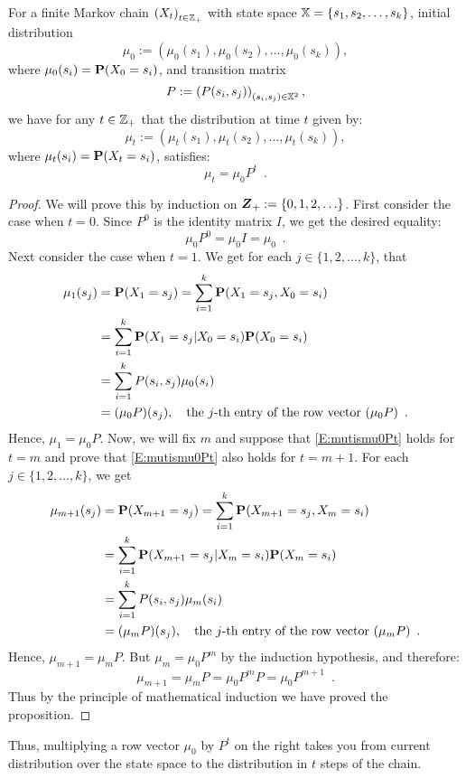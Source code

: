 {\begin{prop}\label{P:FiniteMCProbsAtTimet}
For a finite Markov chain $\left(X_t\right)_{t \in \mathbb{Z}_+}$ with state space $\mathbb{X}=\{s_1,s_2,\ldots,s_k\}$, initial distribution $$\mu_0 := \left( \mu_0(s_1), \mu_0(s_2), \ldots, \mu_0(s_k) \right),$$ where $\mu_0(s_i) = \mathbf{P}(X_0=s_i)$, and transition matrix $$P := \left(P(s_i,s_j)\right)_{(s_i,s_j)\in \mathbb{X}^2},$$ we have for any $t \in \mathbb{Z}_+$ that the distribution at time $t$ given by:
$$\mu_t := \left( \mu_t(s_1), \mu_t(s_2), \ldots, \mu_t(s_k) \right),$$
where $\mu_t(s_i) = \mathbf{P}(X_t=s_i)$, satisfies:
\begin{equation}\label{E:mutismu0Pt}
\mu_t = \mu_0 P^t \enspace .
\end{equation}
\begin{proof}
We will prove this by induction on $\Z_+:=\{0,1,2,\ldots\}$.  First consider the case when $t=0$.  Since $P^0$ is the identity matrix $I$, we get the desired equality:
\[
\mu_0 P^0 = \mu_0 I = \mu_0 \enspace .
\]
Next consider the case when $t=1$.  We get for each $j \in \{1,2,\ldots,k\}$, that
\begin{align*}
\mu_1(s_j) &= \mathbf{P}(X_1 = s_j) = \sum_{i=1}^k \mathbf{P}(X_1=s_j,X_0=s_i)\\
&= \sum_{i=1}^k \mathbf{P}(X_1=s_j | X_0=s_i) \mathbf{P}(X_0=s_i) \\
&= \sum_{i=1}^k P(s_i,s_j) \mu_0(s_i)\\
&= (\mu_0 P)(s_j), \quad \text{the $j$-th entry of the row vector $(\mu_0 P)$} \enspace .
\end{align*}
Hence, $\mu_1=\mu_0 P$.  Now, we will fix $m$ and suppose that \eqref{E:mutismu0Pt} holds for $t=m$ and prove that \eqref{E:mutismu0Pt} also holds for $t=m+1$.  
For each $j \in \{1,2,\ldots,k\}$, we get
\begin{align*}
\mu_{m+1}(s_j) &= \mathbf{P}(X_{m+1} = s_j) = \sum_{i=1}^k \mathbf{P}(X_{m+1}=s_j,X_m=s_i)\\
&= \sum_{i=1}^k \mathbf{P}(X_{m+1}=s_j | X_m=s_i) \mathbf{P}(X_m=s_i) \\
&= \sum_{i=1}^k P(s_i,s_j) \mu_m(s_i)\\
&= (\mu_m P)(s_j), \quad \text{the $j$-th entry of the row vector $(\mu_m P)$} \enspace .
\end{align*}
Hence, $\mu_{m+1}=\mu_m P$.  But $\mu_{m}=\mu_0 P^m$ by the induction hypothesis, and therefore:
\[
\mu_{m+1} = \mu_m P = \mu_0 P^m P = \mu_0 P^{m+1} \enspace .
\]
Thus by the principle of mathematical induction we have proved the proposition.
\end{proof}
\end{prop}
Thus, multiplying a row vector $\mu_0$ by $P^t$ on the right takes you from current distribution over the state space to the distribution in $t$ steps of the chain.  

}
